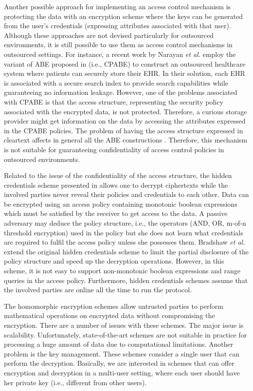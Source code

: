 \documentclass[epsfig,a4paper,11pt,titlepage]{book}
\numberwithin{algorithm}{chapter}
\begin{document}
Another possible approach for implementing an access control mechanism is protecting the data with an encryption scheme where the keys can be generated from the user's credentials (expressing attributes associated with that user). Although these approaches are not devised particularly for outsourced environments, it is still possible to use them as access control mechanisms in outsourced settings. For instance, a recent work by Narayan \emph{et al.} \cite{Narayan:2010} employ the variant of \gls{ABE} proposed in \cite{Bethencourt:2007} (i.e., \gls{CPABE}) to construct an outsourced healthcare system where patients can securely store their \gls{EHR}. In their solution, each \gls{EHR} is associated with a secure search index to provide search capabilities while guaranteeing no information leakage. However, one of the problems associated with \gls{CPABE} is that the access structure, representing the security policy associated with the encrypted data, is not protected. Therefore, a curious storage provider might get information on the data by accessing the attributes expressed in the \gls{CPABE} policies. The problem of having the access structure expressed in cleartext affects in general all the \gls{ABE} constructions \cite{Sahai:2005, Goyal:2006, Ostrovsky:2007, Bethencourt:2007}. Therefore, this mechanism is not suitable for guaranteeing confidentiality of access control policies in outsourced environments.

Related to the issue of the confidentiality of the access structure, the hidden credentials scheme presented in \cite{Holt:2003} allows one to decrypt ciphertexts while the involved parties never reveal their policies and credentials to each other. Data can be encrypted using an access policy containing monotonic boolean expressions which must be satisfied by the receiver to get access to the data. A passive adversary may deduce the policy structure, i.e., the operators (AND, OR, m-of-n threshold encryption) used in the policy but she does not learn what credentials are required to fulfil the access policy unless she possesses them. Bradshaw \emph{et al.} \cite{Bradshaw:2004} extend the original hidden credentials scheme to limit the partial disclosure of the policy structure and speed up the decryption operations. However, in this scheme, it is not easy to support non-monotonic boolean expressions and range queries in the access policy. Furthermore, hidden credentials schemes assume that the involved parties are online all the time to run the protocol.

The homomorphic encryption schemes \cite{Gentry:2009, Dijk:2010, Brakerski:2011, Naehrig:2011, Gentry:2011, HElib:2013, Paillier:1999} allow untrusted parties to perform mathematical operations on encrypted data without compromising the encryption. There are a number of issues with these schemes. The major issue is scalability. Unfortunately, state-of-the-art schemes are not suitable in practice for processing a huge amount of data due to computational limitations. Another problem is the key management. These schemes consider a single user that can perform the decryption. Basically, we are interested in schemes that can offer encryption and decryption in a multi-user setting, where each user should have her private key (i.e., different from other users).
\end{document}
